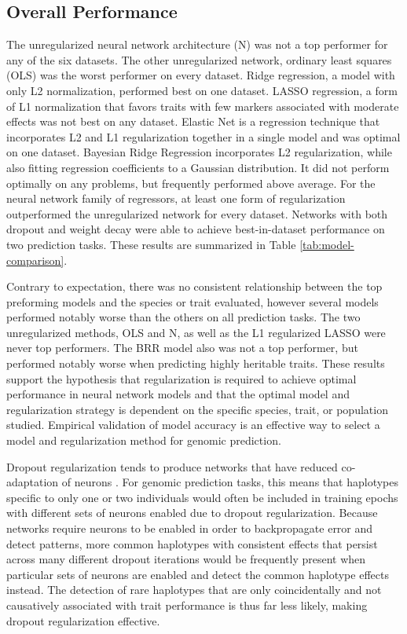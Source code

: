 
\subsection*{Overall Performance}

The unregularized neural network architecture (N) was not a top performer for 
any of the six datasets. The other unregularized network, ordinary least 
squares (OLS) was the worst performer on every dataset. Ridge regression, 
a model with only L2 normalization, performed best on one dataset. 
LASSO regression, a form of L1 normalization that favors traits with few 
markers associated with moderate effects was not best on any dataset. 
Elastic Net is a regression technique that incorporates L2 and L1 
regularization together in a single model and was optimal on one dataset. 
Bayesian Ridge Regression incorporates L2 regularization, while also fitting 
regression coefficients to a Gaussian distribution. It did not perform optimally 
on any problems, but frequently performed above average. For the neural 
network family of regressors, at least one form of regularization 
outperformed the unregularized network for every dataset. Networks with 
both dropout and weight decay were able to achieve best-in-dataset 
performance on two prediction tasks. These results are summarized 
in Table \ref{tab:model-comparison}.

\ifdefined\showtablesandfigures
\fi

Contrary to expectation, there was no consistent relationship between the 
top preforming models and the species or trait evaluated, however several 
models performed notably worse than the others on all prediction tasks.
The two unregularized methods, OLS and N, as well as the L1 regularized 
LASSO were never top performers.  The BRR model also was not a top 
performer, but performed notably worse when predicting highly heritable 
traits. These results support the hypothesis that regularization is 
required to achieve optimal performance in neural network models 
and that the optimal model and regularization strategy is dependent 
on the specific species, trait, or population studied. Empirical 
validation of model accuracy is an effective way to select a 
model and regularization method for genomic prediction.

Dropout regularization tends to produce networks that have reduced 
co-adaptation of neurons \citep{srivastava2014}. For genomic prediction 
tasks, this means that haplotypes specific to only one or two 
individuals would often be included in training epochs with 
different sets of neurons enabled due to dropout regularization. Because
networks require neurons to be enabled in order to backpropagate error 
and detect patterns, more common haplotypes with consistent effects 
that persist across many different dropout iterations would be 
frequently present when particular sets of neurons are enabled and detect the
common haplotype effects instead. The detection of rare haplotypes 
that are only coincidentally and not causatively associated with 
trait performance is thus far less likely, making dropout 
regularization effective.

